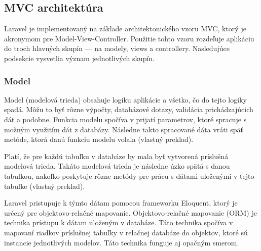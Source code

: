 \subsection{MVC architektúra}
Laravel je implementovaný na základe architektonického vzoru MVC, ktorý je akronymom pre Model-View-Controller. Použitie tohto vzoru rozdeľuje aplikáciu do troch hlavných skupín --- na modely, views a controllery. Nasledujúce podsekcie vysvetlia význam jednotlivých skupín.

\subsubsection{Model}
Model (modelová trieda) obsahuje logiku aplikácie a všetko, čo do tejto logiky spadá. Môžu to byť rôzne výpočty, databázové dotazy, validácia prichádzajúcich dát a podobne. Funkcia modelu spočíva v prijatí parametrov, ktoré spracuje s možným využitím dát z databázy. Následne takto spracované dáta vráti späť metóde, ktorá danú funkciu modelu volala \cite{mvc-architektura} (vlastný preklad).

Platí, že pre každú tabuľku v databáze by mala byť vytvorená príslušná modelová trieda. Takáto modelová trieda je následne úzko spätá s danou tabuľkou, nakoľko poskytuje rôzne metódy pre prácu s dátami uloženými v tejto tabuľke \cite{co-je-eloquent} (vlastný preklad).

Laravel pristupuje k týmto dátam pomocou frameworku Eloquent, ktorý je určený pre objektovo-relačné mapovanie.
Objektovo-relačné mapovanie (ORM) je technika prístupu k dátam uloženým v databáze. Táto technika spočíva v mapovaní riadkov príslušnej tabuľky v relačnej databáze do objektov, ktoré sú instancie jednotlivých modelov. Táto technika funguje aj opačným smerom.

